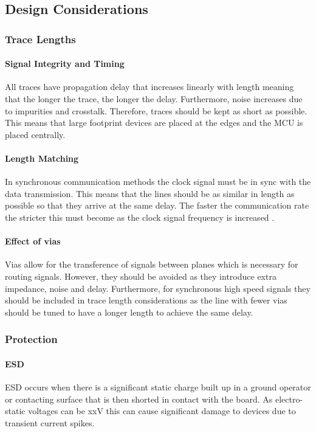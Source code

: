 \subsection{Design Considerations}

\subsubsection{Trace Lengths}
\paragraph{Signal Integrity and Timing}
All traces have propagation delay that increases linearly with length \cite{REF} meaning that the longer the trace, the longer the delay. Furthermore, noise increases due to impurities and crosstalk. Therefore, traces should be kept as short as possible. This means that large footprint devices are placed at the edges and the \gls{MCU} is placed centrally.
\paragraph{Length Matching}
In synchronous communication methods the clock signal must be in sync with the data transmission. This means that the lines should be as similar in length as possible so that they arrive at the same delay. The faster the communication rate the stricter this must become as the clock signal frequency is increased \cite{REF}.
\paragraph{Effect of vias}
Vias allow for the transference of signals between planes which is necessary for routing signals. However, they should be avoided as they introduce extra impedance, noise and delay. Furthermore, for synchronous high speed signals they should be included in trace length considerations as the line with fewer vias should be tuned to have a longer length to achieve the same delay.

\subsubsection{Protection}
\paragraph{\gls{ESD}}
\gls{ESD} occurs when there is a significant static charge built up in a ground operator or contacting surface that is then shorted in contact with the board. As electro-static voltages can be xxV \cite{REF} this can cause significant damage to devices due to transient current spikes.
